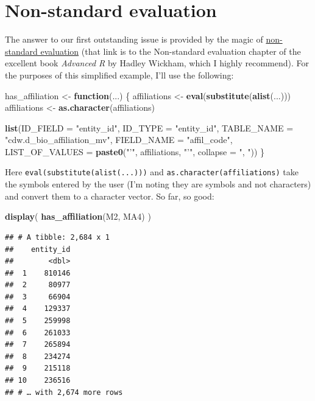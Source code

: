 \documentclass[]{book}
\newenvironment{Shaded}{\begin{snugshade}}{\end{snugshade}}
\newcommand{\ControlFlowTok}[1]{\textcolor[rgb]{0.13,0.29,0.53}{\textbf{#1}}}
\newcommand{\DataTypeTok}[1]{\textcolor[rgb]{0.13,0.29,0.53}{#1}}
\newcommand{\KeywordTok}[1]{\textcolor[rgb]{0.13,0.29,0.53}{\textbf{#1}}}
\newcommand{\NormalTok}[1]{#1}
\newcommand{\StringTok}[1]{\textcolor[rgb]{0.31,0.60,0.02}{#1}}
\begin{document}
\hypertarget{non-standard-evaluation}{%
\section{Non-standard evaluation}\label{non-standard-evaluation}}

The answer to our first outstanding issue is provided by the magic of \href{http://adv-r.had.co.nz/Computing-on-the-language.html}{non-standard evaluation} (that link is to the Non-standard evaluation chapter of the excellent book \emph{Advanced R} by Hadley Wickham, which I highly recommend). For the purposes of this simplified example, I'll use the following:

\begin{Shaded}
\begin{Highlighting}[]
\NormalTok{has_affiliation <-}\StringTok{ }\ControlFlowTok{function}\NormalTok{(...) \{}
\NormalTok{    affiliations <-}\StringTok{ }\KeywordTok{eval}\NormalTok{(}\KeywordTok{substitute}\NormalTok{(}\KeywordTok{alist}\NormalTok{(...)))}
\NormalTok{    affiliations <-}\StringTok{ }\KeywordTok{as.character}\NormalTok{(affiliations)}
    
    \KeywordTok{list}\NormalTok{(}\DataTypeTok{ID_FIELD =} \StringTok{"entity_id"}\NormalTok{,}
         \DataTypeTok{ID_TYPE =} \StringTok{"entity_id"}\NormalTok{,}
         \DataTypeTok{TABLE_NAME =} \StringTok{"cdw.d_bio_affiliation_mv"}\NormalTok{,}
         \DataTypeTok{FIELD_NAME =} \StringTok{"affil_code"}\NormalTok{,}
         \DataTypeTok{LIST_OF_VALUES =} \KeywordTok{paste0}\NormalTok{(}\StringTok{"'"}\NormalTok{, affiliations, }\StringTok{"'"}\NormalTok{,}
                                \DataTypeTok{collapse =} \StringTok{", "}\NormalTok{))    }
\NormalTok{\}}
\end{Highlighting}
\end{Shaded}

Here \texttt{eval(substitute(alist(...)))} and \texttt{as.character(affiliations)} take the symbols entered by the user (I'm noting they are symbols and not characters) and convert them to a character vector. So far, so good:

\begin{Shaded}
\begin{Highlighting}[]
\KeywordTok{display}\NormalTok{(}
    \KeywordTok{has_affiliation}\NormalTok{(M2, MA4)}
\NormalTok{)}
\end{Highlighting}
\end{Shaded}

\begin{verbatim}
## # A tibble: 2,684 x 1
##    entity_id
##        <dbl>
##  1    810146
##  2     80977
##  3     66904
##  4    129337
##  5    259998
##  6    261033
##  7    265894
##  8    234274
##  9    215118
## 10    236516
## # … with 2,674 more rows
\end{verbatim}
\end{document}
